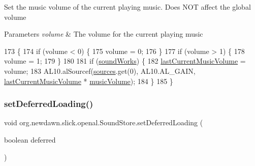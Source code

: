 Set the music volume of the current playing music. Does N\+OT affect the global volume


\begin{DoxyParams}{Parameters}
{\em volume} & The volume for the current playing music \\
\hline
\end{DoxyParams}

\begin{DoxyCode}
173                                                     \{
174         \textcolor{keywordflow}{if} (volume < 0) \{
175             volume = 0;
176         \}
177         \textcolor{keywordflow}{if} (volume > 1) \{
178             volume = 1;
179         \}
180         
181         \textcolor{keywordflow}{if} (\mbox{\hyperlink{classorg_1_1newdawn_1_1slick_1_1openal_1_1_sound_store_ae563e9c1a01e333dc2350f1450f451fd}{soundWorks}}) \{
182             \mbox{\hyperlink{classorg_1_1newdawn_1_1slick_1_1openal_1_1_sound_store_a2e3c5e8604fb9229621276c4d1ea1ffd}{lastCurrentMusicVolume}} = volume;
183             AL10.alSourcef(\mbox{\hyperlink{classorg_1_1newdawn_1_1slick_1_1openal_1_1_sound_store_a3a2ffa73acd847102bb30140129c440b}{sources}}.get(0), AL10.AL\_GAIN, 
      \mbox{\hyperlink{classorg_1_1newdawn_1_1slick_1_1openal_1_1_sound_store_a2e3c5e8604fb9229621276c4d1ea1ffd}{lastCurrentMusicVolume}} * \mbox{\hyperlink{classorg_1_1newdawn_1_1slick_1_1openal_1_1_sound_store_a1394ddfb866b8bc402414b8f861227c0}{musicVolume}}); 
184         \}
185     \}
\end{DoxyCode}
\mbox{\label{classorg_1_1newdawn_1_1slick_1_1openal_1_1_sound_store_aaad12ea85c393689fdd9f029ecfba995}} 
\subsubsection{\texorpdfstring{set\+Deferred\+Loading()}{setDeferredLoading()}}
{\footnotesize\ttfamily void org.\+newdawn.\+slick.\+openal.\+Sound\+Store.\+set\+Deferred\+Loading (\begin{DoxyParamCaption}\item[{boolean}]{deferred }\end{DoxyParamCaption})\hspace{0.3cm}{\ttfamily [inline]}}

